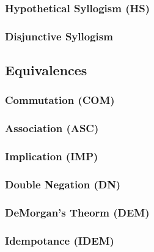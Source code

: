 \documentclass{hitec}
\begin{document}
\subsubsection{Hypothetical Syllogism (HS)}
\subsubsection{Disjunctive Syllogism}

\subsection{Equivalences}
\subsubsection{Commutation (COM)}

\subsubsection{Association (ASC)}

\subsubsection{Implication (IMP)}
\subsubsection{Double Negation (DN)}
\subsubsection{DeMorgan's Theorm (DEM)}

\subsubsection{Idempotance (IDEM)}
\end{document}
